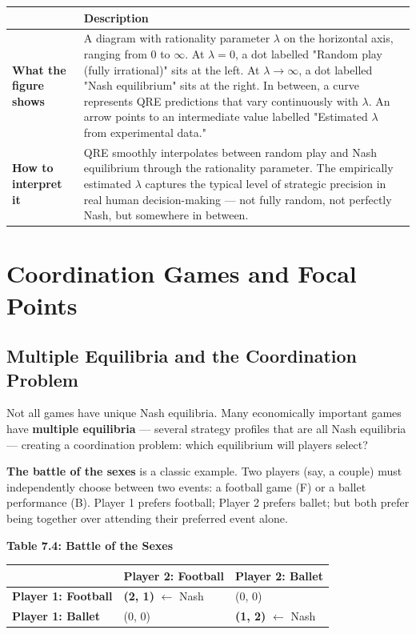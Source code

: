 \documentclass[12pt, letterpaper]{article}
\begin{document}
\begin{table}[H]
\centering
\small
\begin{tabularx}{\linewidth}{lY}
\toprule
 & Description \\
\midrule
\textbf{What the figure shows} & A diagram with rationality parameter $\lambda$ on the horizontal axis, ranging from 0 to $\infty$. At $\lambda = 0$, a dot labelled "Random play (fully irrational)" sits at the left. At $\lambda \to \infty$, a dot labelled "Nash equilibrium" sits at the right. In between, a curve represents QRE predictions that vary continuously with $\lambda$. An arrow points to an intermediate value labelled "Estimated $\lambda$ from experimental data." \\
\textbf{How to interpret it} & QRE smoothly interpolates between random play and Nash equilibrium through the rationality parameter. The empirically estimated $\lambda$ captures the typical level of strategic precision in real human decision-making --- not fully random, not perfectly Nash, but somewhere in between. \\
\bottomrule
\end{tabularx}
\end{table}


\medskip


\section{Coordination Games and Focal Points}



\subsection{Multiple Equilibria and the Coordination Problem}


Not all games have unique Nash equilibria. Many economically important games have \textbf{multiple equilibria} --- several strategy profiles that are all Nash equilibria --- creating a coordination problem: which equilibrium will players select?

\textbf{The battle of the sexes} is a classic example. Two players (say, a couple) must independently choose between two events: a football game (F) or a ballet performance (B). Player 1 prefers football; Player 2 prefers ballet; but both prefer being together over attending their preferred event alone.

\textbf{Table 7.4: Battle of the Sexes}


\begin{table}[H]
\centering
\small
\begin{tabularx}{\linewidth}{lYY}
\toprule
 & Player 2: Football & Player 2: Ballet \\
\midrule
\textbf{Player 1: Football} & \textbf{(2, 1)} $\leftarrow$ Nash & (0, 0) \\
\textbf{Player 1: Ballet} & (0, 0) & \textbf{(1, 2)} $\leftarrow$ Nash \\
\bottomrule
\end{tabularx}
\end{table}
\end{document}
